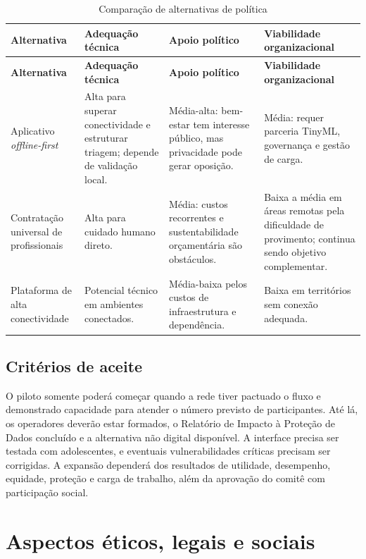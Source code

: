 \documentclass[
  12pt,
  openright,
  oneside,
  a4paper,
  english,
  brazil
]{abntex2}
\begin{document}
\begin{longtable}{p{3.2cm}p{3.4cm}p{3.4cm}p{3.4cm}}
\caption{Comparação de alternativas de política}\label{tab:alternativas}\\
\toprule
\textbf{Alternativa} & \textbf{Adequação técnica} & \textbf{Apoio político} & \textbf{Viabilidade organizacional} \\
\midrule
\endfirsthead
\toprule
\textbf{Alternativa} & \textbf{Adequação técnica} & \textbf{Apoio político} & \textbf{Viabilidade organizacional} \\
\midrule
\endhead
Aplicativo \emph{offline-first} & Alta para superar conectividade e estruturar triagem; depende de validação local. & Média-alta: bem-estar tem interesse público, mas privacidade pode gerar oposição. & Média: requer parceria TinyML, governança e gestão de carga. \\
\addlinespace
Contratação universal de profissionais & Alta para cuidado humano direto. & Média: custos recorrentes e sustentabilidade orçamentária são obstáculos. & Baixa a média em áreas remotas pela dificuldade de provimento; continua sendo objetivo complementar. \\
\addlinespace
Plataforma de alta conectividade & Potencial técnico em ambientes conectados. & Média-baixa pelos custos de infraestrutura e dependência. & Baixa em territórios sem conexão adequada. \\
\bottomrule
\end{longtable}

\section{Critérios de aceite}

O piloto somente poderá começar quando a rede tiver pactuado o fluxo e
demonstrado capacidade para atender o número previsto de participantes. Até lá,
os operadores deverão estar formados, o Relatório de Impacto à Proteção de Dados
concluído e a alternativa não digital disponível. A interface precisa ser
testada com adolescentes, e eventuais vulnerabilidades críticas precisam ser
corrigidas. A expansão dependerá dos resultados de utilidade, desempenho,
equidade, proteção e carga de trabalho, além da aprovação do comitê com
participação social.

\chapter{Aspectos éticos, legais e sociais}
\end{document}
